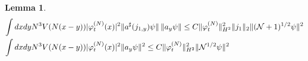 \documentclass[11pt,a4paper,DIV11]{scrartcl}	%
\newtheorem{lemma}[thm]{Lemma}
\newcommand{\cN}{{\cal N}}
\begin{document}
\begin{lemma}
\begin{equation}
\begin{split}
 \int dx dy N^3 V(N (x-y))& |\varphi_t^{(N)} (x)|^2  \| a^\sharp (j_{1,y}) \psi \| \, \| a_y \psi \| \leq C\| \varphi_t^{(N)} \|_{H^2}^2 \| j_1 \|_2 \| (\cN+1)^{1/2} \psi \|^2 \\
\int dx dy N^3 V(N (x-y)) &|\varphi_t^{(N)} (x)|^2 \| a_y \psi \|^2 \leq C \| \varphi_t^{(N)} \|_{H^2}^2 \| \cN^{1/2} \psi \|^2
\end{split} \end{equation}
\end{lemma}
\end{document}
